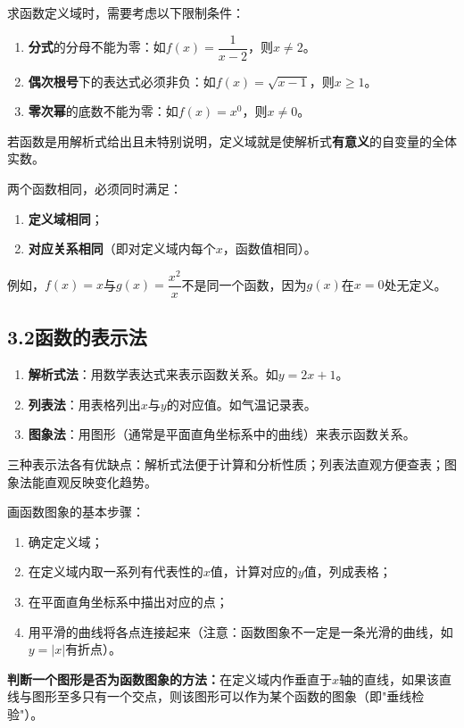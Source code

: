 \documentclass[12pt, a4paper]{ctexart}
\begin{document}
\begin{knowledgebox}[定义域的求法]
求函数定义域时，需要考虑以下限制条件：
\begin{enumerate}[leftmargin=2em]
  \item \textbf{分式}的分母不能为零：如$f(x)=\dfrac{1}{x-2}$，则$x\neq 2$。
  \item \textbf{偶次根号}下的表达式必须非负：如$f(x)=\sqrt{x-1}$，则$x\geq 1$。
  \item \textbf{零次幂}的底数不能为零：如$f(x)=x^0$，则$x\neq 0$。
\end{enumerate}
若函数是用解析式给出且未特别说明，定义域就是使解析式\textbf{有意义}的自变量的全体实数。
\end{knowledgebox}

\begin{tipbox}[规律：两个函数相同]
两个函数相同，必须同时满足：
\begin{enumerate}[leftmargin=2em]
  \item \textbf{定义域相同}；
  \item \textbf{对应关系相同}（即对定义域内每个$x$，函数值相同）。
\end{enumerate}
例如，$f(x)=x$与$g(x)=\dfrac{x^2}{x}$不是同一个函数，因为$g(x)$在$x=0$处无定义。
\end{tipbox}

\subsection*{3.2\quad 函数的表示法}

\begin{knowledgebox}[函数的三种表示法]
\begin{enumerate}[leftmargin=2em]
  \item \textbf{解析式法}：用数学表达式来表示函数关系。如$y=2x+1$。
  \item \textbf{列表法}：用表格列出$x$与$y$的对应值。如气温记录表。
  \item \textbf{图象法}：用图形（通常是平面直角坐标系中的曲线）来表示函数关系。
\end{enumerate}
三种表示法各有优缺点：解析式法便于计算和分析性质；列表法直观方便查表；图象法能直观反映变化趋势。
\end{knowledgebox}

\begin{knowledgebox}[函数图象的画法]
画函数图象的基本步骤：
\begin{enumerate}[leftmargin=2em]
  \item 确定定义域；
  \item 在定义域内取一系列有代表性的$x$值，计算对应的$y$值，列成表格；
  \item 在平面直角坐标系中描出对应的点；
  \item 用平滑的曲线将各点连接起来（注意：函数图象不一定是一条光滑的曲线，如$y=|x|$有折点）。
\end{enumerate}
\textbf{判断一个图形是否为函数图象的方法：}在定义域内作垂直于$x$轴的直线，如果该直线与图形至多只有一个交点，则该图形可以作为某个函数的图象（即"垂线检验"）。
\end{knowledgebox}
\end{document}

